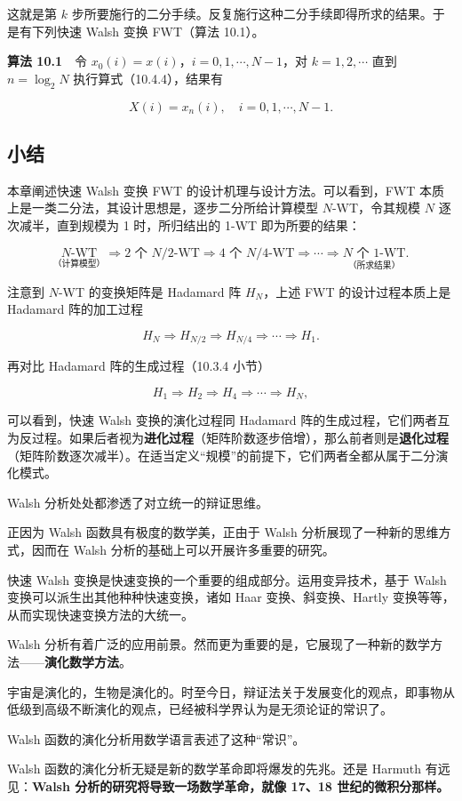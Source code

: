 这就是第 \(k\) 步所要施行的二分手续。反复施行这种二分手续即得所求的结果。于是有下列快速 Walsh 变换 FWT（算法 10.1）。

\textbf{算法 10.1}　令 \(x_0(i)=x(i)\)，\(i=0,1,\cdots,N-1\)，对 \(k=1,2,\cdots\) 直到 \(n=\log_2N\) 执行算式（10.4.4），结果有

\[
X(i)=x_n(i),\quad i=0,1,\cdots,N-1.
\]

\subsection{小结}\label{ch10-ux5c0fux7ed3}

本章阐述快速 Walsh 变换 FWT 的设计机理与设计方法。可以看到，FWT 本质上是一类二分法，其设计思想是，逐步二分所给计算模型 \(N\)-WT，令其规模 \(N\) 逐次减半，直到规模为 1 时，所归结出的 1-WT 即为所要的结果：

\[
\underset{\text{（计算模型）}}{N\text{-WT}}\Rightarrow2\text{ 个 }N/2\text{-WT}\Rightarrow4\text{ 个 }N/4\text{-WT}\Rightarrow\cdots\Rightarrow\underset{\text{（所求结果）}}{N\text{ 个 }1\text{-WT}}.
\]

注意到 \(N\)-WT 的变换矩阵是 Hadamard 阵 \(H_N\)，上述 FWT 的设计过程本质上是 Hadamard 阵的加工过程

\[
H_N\Rightarrow H_{N/2}\Rightarrow H_{N/4}\Rightarrow\cdots\Rightarrow H_1.
\]

再对比 Hadamard 阵的生成过程（10.3.4 小节）

\[
H_1\Rightarrow H_2\Rightarrow H_4\Rightarrow\cdots\Rightarrow H_N,
\]

可以看到，快速 Walsh 变换的演化过程同 Hadamard 阵的生成过程，它们两者互为反过程。如果后者视为\textbf{进化过程}（矩阵阶数逐步倍增），那么前者则是\textbf{退化过程}（矩阵阶数逐次减半）。在适当定义``规模''的前提下，它们两者全都从属于二分演化模式。

Walsh 分析处处都渗透了对立统一的辩证思维。

正因为 Walsh 函数具有极度的数学美，正由于 Walsh 分析展现了一种新的思维方式，因而在 Walsh 分析的基础上可以开展许多重要的研究。

快速 Walsh 变换是快速变换的一个重要的组成部分。运用变异技术，基于 Walsh 变换可以派生出其他种种快速变换，诸如 Haar 变换、斜变换、Hartly 变换等等，从而实现快速变换方法的大统一。

Walsh 分析有着广泛的应用前景。然而更为重要的是，它展现了一种新的数学方法------\textbf{演化数学方法}。

宇宙是演化的，生物是演化的。时至今日，辩证法关于发展变化的观点，即事物从低级到高级不断演化的观点，已经被科学界认为是无须论证的常识了。

Walsh 函数的演化分析用数学语言表述了这种``常识''。

Walsh 函数的演化分析无疑是新的数学革命即将爆发的先兆。还是 Harmuth 有远见：\textbf{Walsh 分析的研究将导致一场数学革命，就像 17、18 世纪的微积分那样。}

